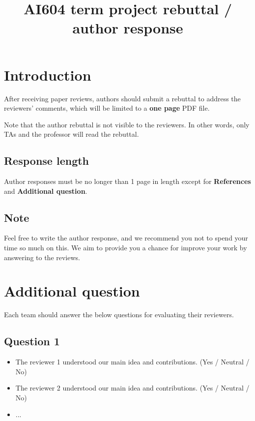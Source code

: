 \documentclass[rebuttal]{cvpr}
\begin{document}
\title{AI604 term project rebuttal / author response}  %

\maketitle
\thispagestyle{empty}


\section{Introduction}

After receiving paper reviews, authors should submit a rebuttal to address the reviewers' comments, which will be limited to a {\bf one page} PDF file.

Note that the author rebuttal is not visible to the reviewers. In other words, only TAs and the professor will read the rebuttal. 

\subsection{Response length}

Author responses must be no longer than 1 page in length except for \textbf{References} and \textbf{Additional question}.

\subsection{Note}

Feel free to write the author response, and we recommend you not to spend your time so much on this. We aim to provide you a chance for improve your work by answering to the reviews.


\section{Additional question}
Each team should answer the below questions for evaluating their reviewers. 

\subsection{Question 1}
\begin{itemize}
    \item The reviewer 1 understood our main idea and contributions. (Yes / Neutral / No)
    \item The reviewer 2 understood our main idea and contributions. (Yes / Neutral / No)
    \item ...
\end{itemize}
\end{document}

